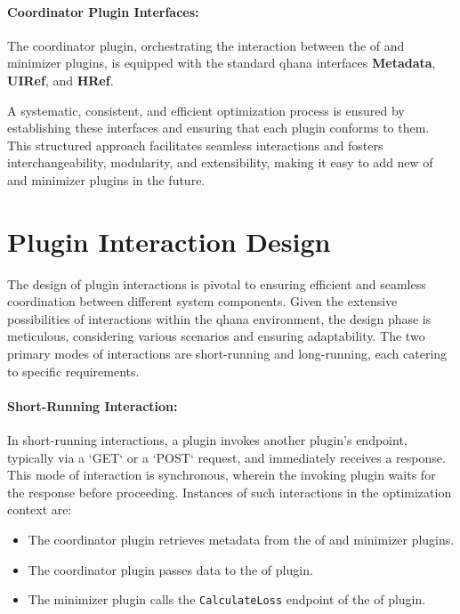 \documentclass[
  a4paper,  %
  twoside,  %
  bibliography=totoc,
  headsepline,
  cleardoublepage=empty,
  parskip=half,
  draft=false
]{scrbook}
\begin{document}
\paragraph{Coordinator Plugin Interfaces:}

The coordinator plugin, orchestrating the interaction between the \gls{of} and minimizer plugins, is equipped with the standard \gls{qhana} interfaces \textbf{Metadata}, \textbf{UIRef}, and \textbf{HRef}.

A systematic, consistent, and efficient optimization process is ensured by establishing these interfaces and ensuring that each plugin conforms to them.
This structured approach facilitates seamless interactions and fosters interchangeability, modularity, and extensibility, making it easy to add new \gls{of} and minimizer plugins in the future.

\section{Plugin Interaction Design}

The design of plugin interactions is pivotal to ensuring efficient and seamless coordination between different system components.
Given the extensive possibilities of interactions within the \gls{qhana} environment, the design phase is meticulous, considering various scenarios and ensuring adaptability.
The two primary modes of interactions are short-running and long-running, each catering to specific requirements.

\paragraph{Short-Running Interaction:}

In short-running interactions, a plugin invokes another plugin's endpoint, typically via a `GET` or a `POST` request, and immediately receives a response.
This mode of interaction is synchronous, wherein the invoking plugin waits for the response before proceeding.
Instances of such interactions in the optimization context are:
\begin{itemize}
    \item The coordinator plugin retrieves metadata from the \gls{of} and minimizer plugins.
    \item The coordinator plugin passes data to the \gls{of} plugin.
    \item The minimizer plugin calls the \texttt{CalculateLoss} endpoint of the \gls{of} plugin.
\end{itemize}
\end{document}
